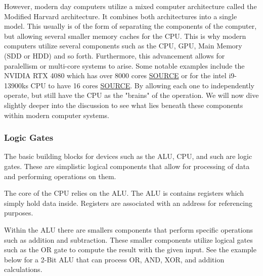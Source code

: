 However, modern day computers utilize a mixed computer architecture called the Modified Harvard architecture.
It combines both architectures into a single model.
This usually is of the form of separating the components of the computer, but allowing several smaller memory caches for the CPU.
This is why modern computers utilize several components such as the CPU, GPU, Main Memory (SDD or HDD) and so forth.
Furthermore, this advancement allows for paralellism or multi-core systems to arise.
Some notable examples include the NVIDIA RTX 4080 which has over 8000 cores \href{https://www.techpowerup.com/gpu-specs/geforce-rtx-4080.c3888}{SOURCE} or for the intel i9-13900ks CPU to have 16 cores \href{https://www.intel.com/content/www/us/en/products/sku/232167/intel-core-i913900ks-processor-36m-cache-up-to-6-00-ghz/specifications.html}{SOURCE}.
By allowing each one to independently operate, but still have the CPU as the "brains" of the operation.
We will now dive slightly deeper into the discussion to see what lies beneath these components within modern computer systems.

\subsubsection{Logic Gates}\label{subsec:LogicGates}

The basic building blocks for devices such as the ALU, CPU, and such are logic gates.
These are simplistic logical components that allow for processing of data and performing operations on them.

The core of the CPU relies on the ALU.
The ALU is contains registers which simply hold data inside.
Registers are associated with an address for referencing purposes.

Within the ALU there are smallers components that perform specific operations such as addition and subtraction.
These smaller components utilize logical gates such as the OR gate to compute the result with the given input.
See the example below for a 2-Bit ALU that can process OR, AND, XOR, and addition calculations.

